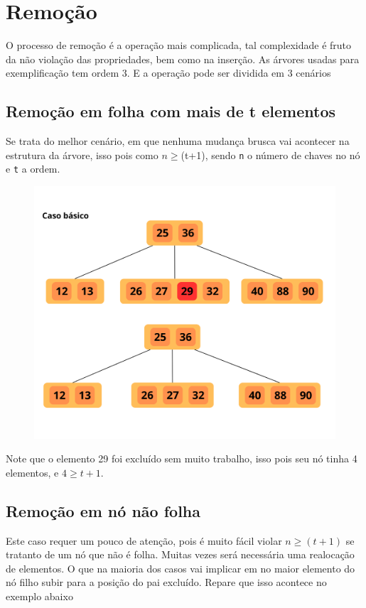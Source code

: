\section*{Remoção}
O processo de remoção é a operação mais complicada, tal complexidade é fruto da não violação das propriedades, bem como na inserção. As árvores usadas para exemplificação tem ordem 3. E a operação pode ser dividida em 3 cenários

\subsection*{Remoção em folha com mais de t elementos}
Se trata do melhor cenário, em que nenhuma mudança brusca vai acontecer na estrutura da árvore, isso pois como $n \geq $(t+1), sendo \texttt{n} o número de chaves no nó e \texttt{t} a ordem.

\begin{figure}[H]
	\centering
	\includegraphics[scale=0.2]{figures/remocao1.png}
\end{figure}

Note que o elemento 29 foi excluído sem muito trabalho, isso pois seu nó tinha 4 elementos, e $4 \geq t+1$.

\subsection*{Remoção em nó não folha}

Este caso requer um pouco de atenção, pois é muito fácil violar $n \geq (t+1)$ se tratanto de um nó que não é folha. Muitas vezes será necessária uma realocação de elementos. O que na maioria dos casos vai implicar em no maior elemento do nó filho subir para a posição do pai excluído. Repare que isso acontece no exemplo abaixo

